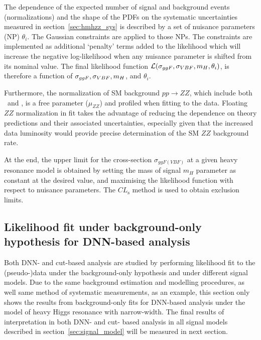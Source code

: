 The dependence of the expected number of signal and background events (normalizations) and the shape of the PDFs on the systematic uncertainties measured in section~\ref{sec:hmhzz_sys} 
is described by a set of nuisance parameters (NP) $\theta_{i}$.
The Gaussian constraints are applied to those NPs.
The constraints are implemented as additional `penalty' terms added to the likelihood which will increase the negative log-likelihood when any nuisance parameter is shifted from its nominal value. 
The final likelihood function ${\cal L } ( \sigma_{ggF}, \sigma_{VBF},m_{H},\theta_{i})$, is therefore a function of  $\sigma_{ggF}, \sigma_{VBF} , m_{H}$, and $\theta_{i}$.

Furthermore, the normalization of SM background $pp\to ZZ$, which include both \qqZZ\ and \ggZZ, is a free parameter ($\mu_{ZZ}$) and profiled when fitting to the data.
Floating $ZZ$ normalization in fit takes the advantage of reducing the dependence on theory predictions and their associated uncertainties,
especially given that the increased data luminosity would provide precise determination of the SM $ZZ$ background rate.

At the end, the upper limit for the cross-section $\sigma_{ggF(VBF)}$ at a given heavy resonance model is obtained by setting the mass of signal $m_{H}$ parameter as constant at the desired value,
and maximising the likelihood function with respect to nuisance parameters.
The $CL_{\textrm{s}}$ \cite{cls} method is used to obtain exclusion limits.

\subsection{Likelihood fit under background-only hypothesis for DNN-based analysis}

Both DNN- and cut-based analysis are studied by performing likelihood fit to the (pseudo-)data under the background-only hypothesis and under different signal models.
Due to the same background estimation and modelling procedures, as well same method of systematic measurements,
as an example, this section only shows the results from background-only fits for DNN-based analysis under the model of heavy Higgs resonance with narrow-width.
The final results of interpretation in both DNN- and cut- based analysis in all signal models described in section~\ref{sec:signal_model} will be measured in next section.

